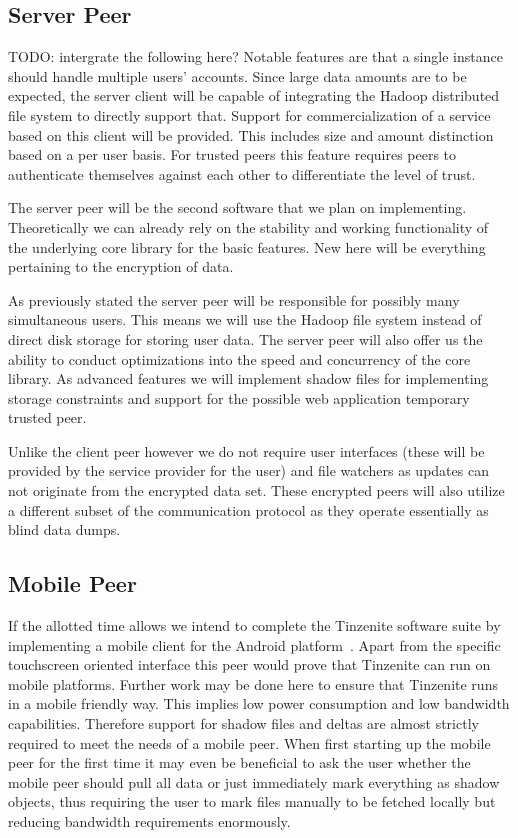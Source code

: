 \subsection{Server Peer}

TODO: intergrate the following here?
Notable features are that a single instance should handle multiple users' accounts.
Since large data amounts are to be expected, the server client will be capable of integrating the Hadoop distributed file system to directly support that.
Support for commercialization of a service based on this client will be provided.
This includes size and amount distinction based on a per user basis.
For trusted peers this feature requires peers to authenticate themselves against each other to differentiate the level of trust.

The server peer will be the second software that we plan on implementing.
Theoretically we can already rely on the stability and working functionality of the underlying core library for the basic features.
New here will be everything pertaining to the encryption of data.

As previously stated the server peer will be responsible for possibly many simultaneous users.
This means we will use the Hadoop file system instead of direct disk storage for storing user data.
The server peer will also offer us the ability to conduct optimizations into the speed and concurrency of the core library.
As advanced features we will implement shadow files for implementing storage constraints and support for the possible web application temporary trusted peer.

Unlike the client peer however we do not require user interfaces (these will be provided by the service provider for the user) and file watchers as updates can not originate from the encrypted data set.
These encrypted peers will also utilize a different subset of the communication protocol as they operate essentially as blind data dumps.

\subsection{Mobile Peer}

If the allotted time allows we intend to complete the Tinzenite software suite by implementing a mobile client for the Android platform~\cite{web:site:android}.
Apart from the specific touchscreen oriented interface this peer would prove that Tinzenite can run on mobile platforms.
Further work may be done here to ensure that Tinzenite runs in a mobile friendly way.
This implies low power consumption and low bandwidth capabilities.
Therefore support for shadow files and deltas are almost strictly required to meet the needs of a mobile peer.
When first starting up the mobile peer for the first time it may even be beneficial to ask the user whether the mobile peer should pull all data or just immediately mark everything as shadow objects, thus requiring the user to mark files manually to be fetched locally but reducing bandwidth requirements enormously.

